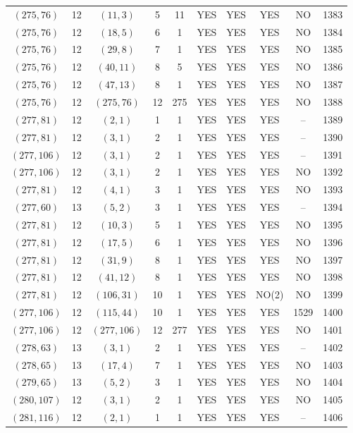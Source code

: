 \begin{longtable}{|c|c|c|c|c|c|c|c|c|c|}
$(275, 76)$ & 12 & $(11, 3)$ & 5 & 11 & YES & YES & YES & NO & 1383\\
$(275, 76)$ & 12 & $(18, 5)$ & 6 & 1 & YES & YES & YES & NO & 1384\\
$(275, 76)$ & 12 & $(29, 8)$ & 7 & 1 & YES & YES & YES & NO & 1385\\
$(275, 76)$ & 12 & $(40, 11)$ & 8 & 5 & YES & YES & YES & NO & 1386\\
$(275, 76)$ & 12 & $(47, 13)$ & 8 & 1 & YES & YES & YES & NO & 1387\\
$(275, 76)$ & 12 & $(275, 76)$ & 12 & 275 & YES & YES & YES & NO & 1388\\
$(277, 81)$ & 12 & $(2, 1)$ & 1 & 1 & YES & YES & YES & -- & 1389\\
$(277, 81)$ & 12 & $(3, 1)$ & 2 & 1 & YES & YES & YES & -- & 1390\\
$(277, 106)$ & 12 & $(3, 1)$ & 2 & 1 & YES & YES & YES & -- & 1391\\
$(277, 106)$ & 12 & $(3, 1)$ & 2 & 1 & YES & YES & YES & NO & 1392\\
$(277, 81)$ & 12 & $(4, 1)$ & 3 & 1 & YES & YES & YES & NO & 1393\\
$(277, 60)$ & 13 & $(5, 2)$ & 3 & 1 & YES & YES & YES & -- & 1394\\
$(277, 81)$ & 12 & $(10, 3)$ & 5 & 1 & YES & YES & YES & NO & 1395\\
$(277, 81)$ & 12 & $(17, 5)$ & 6 & 1 & YES & YES & YES & NO & 1396\\
$(277, 81)$ & 12 & $(31, 9)$ & 8 & 1 & YES & YES & YES & NO & 1397\\
$(277, 81)$ & 12 & $(41, 12)$ & 8 & 1 & YES & YES & YES & NO & 1398\\
$(277, 81)$ & 12 & $(106, 31)$ & 10 & 1 & YES & YES & NO(2) & NO & 1399\\
$(277, 106)$ & 12 & $(115, 44)$ & 10 & 1 & YES & YES & YES & 1529 & 1400\\
$(277, 106)$ & 12 & $(277, 106)$ & 12 & 277 & YES & YES & YES & NO & 1401\\
$(278, 63)$ & 13 & $(3, 1)$ & 2 & 1 & YES & YES & YES & -- & 1402\\
$(278, 65)$ & 13 & $(17, 4)$ & 7 & 1 & YES & YES & YES & NO & 1403\\
$(279, 65)$ & 13 & $(5, 2)$ & 3 & 1 & YES & YES & YES & NO & 1404\\
$(280, 107)$ & 12 & $(3, 1)$ & 2 & 1 & YES & YES & YES & NO & 1405\\
$(281, 116)$ & 12 & $(2, 1)$ & 1 & 1 & YES & YES & YES & -- & 1406\\

\end{longtable}

